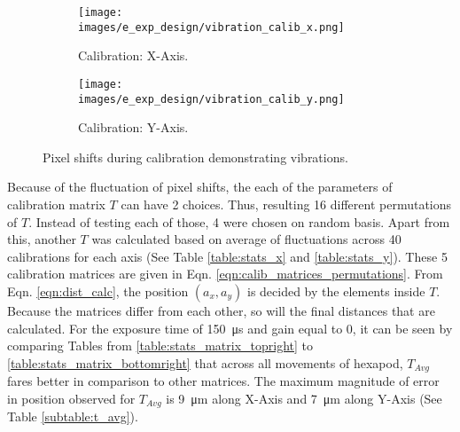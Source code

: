\begin{figure}[h]
    \centering
    \begin{subfigure}{0.49\textwidth}
        \centering
        \texttt{[image: images/e\_exp\_design/vibration\_calib\_x.png]}
        \caption{Calibration: X-Axis.}
        \label{fig:vibration_calib_x.png}
    \end{subfigure}
    \begin{subfigure}{0.49\textwidth}
        \centering
        \texttt{[image: images/e\_exp\_design/vibration\_calib\_y.png]}
        \caption{Calibration: Y-Axis.}
        \label{fig:vibration_calib_y.png}
    \end{subfigure}
    \caption{Pixel shifts during calibration demonstrating vibrations.}
    \label{fig:vibration}
\end{figure}

\vspace{5mm}
\noindent Because of the fluctuation of pixel shifts, the each of the parameters of calibration matrix $T$ can have 2 choices. Thus, resulting 16 different permutations of $T$. Instead of testing each of those, 4 were chosen on random basis. Apart from this, another $T$ was calculated based on average of fluctuations across 40 calibrations for each axis (See Table \ref{table:stats_x} and \ref{table:stats_y}). These 5 calibration matrices are given in Eqn. \ref{eqn:calib_matrices_permutations}. From Eqn. \ref{eqn:dist_calc}, the position $(a_x, a_y)$ is decided by the elements inside $T$. Because the matrices differ from each other, so will the final distances that are calculated. For the exposure time of \SI{150}{\micro\second} and gain equal to $0$, it can be seen by comparing Tables from \ref{table:stats_matrix_topright} to \ref{table:stats_matrix_bottomright} that across all movements of hexapod, $T_{Avg}$ fares better in comparison to other matrices. The maximum magnitude of error in position observed for $T_{Avg}$ is \SI{9}{\micro\meter} along X-Axis and \SI{7}{\micro\meter} along Y-Axis (See Table \ref{subtable:t_avg}).

